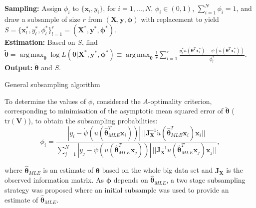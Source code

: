 \documentclass[a0paper,portrait]{baposter}
\DeclareMathOperator*{\argmaxA}{arg\,max}
\begin{document}
\begin{poster}
{    \begin{algorithm}[H]
    \SetAlgoLined
        \textbf{Sampling:} Assign $\phi_i$ to $\{\bm{x}_i,y_i\}$, for $i=1,...,N$, $\phi_i \in (0,1)$, $\sum_{i=1}^{N} \phi_i=1$, and draw a subsample of size $r$ from $(\bm{X},\bm{y},\bm{\phi})$ with replacement to yield $S = \{\bm{x}_l^*,y_l^*,\phi_l^*\}_{l=1}^r = (\bm{X}^*,\bm{y}^*,\bm{\phi}^*)$. \\
        \textbf{Estimation:} Based on $S$, find
        $\tilde{\bm{\theta}} = \argmaxA_{\bm{\theta}} \log{L(\bm{\theta}|\bm{X}^*,\bm{y}^*,\bm{\phi}^*)} \equiv \argmaxA_{\bm{\theta}} \frac{1}{r} \sum_{l=1}^{r} \frac{y^*_l u(\bm{\theta}^T\bm{x}^*_l) - \psi(u(\bm{\theta}^T\bm{x}^*_l))}{\phi^*_l}.$ \textbf{Output:} $\tilde{\bm{\theta}}$ and $S$.
    \caption{General subsampling algorithm \textcite{ai2021optimal}} \label{Algo:GenSam}
    \end{algorithm} 
To determine the values of $\phi$, %
\textcite{ai2021optimal} considered the $A$-optimality criterion, corresponding to minimisation of the asymptotic mean squared error of $\tilde{\bm{\theta}}$ ($\mbox{tr}(\bm{V})$), to obtain the subsampling probabilities:
        \begin{equation}\label{Eq:1}
            \phi_i = \frac{|y_i - \dot{\psi}(u(\hat{\bm{\theta}}^T_{MLE}\bm{x}_i))|\, ||\bm{J}^{-1}_{\bm{X}} \dot{u}(\hat{\bm{\theta}}^T_{MLE}\bm{x}_i)\bm{x}_i ||}{\sum_{j=1}^{N} |y_j - \dot{\psi}(u(\hat{\bm{\theta}}^T_{MLE}\bm{x}_j))|\, ||\bm{J}^{-1}_{\bm{X}} \dot{u}(\hat{\bm{\theta}}^T_{MLE}\bm{x}_j)\bm{x}_j ||},    
        \end{equation}
        
where $\hat{\bm{\theta}}_{MLE}$ is an estimate of $\bm{\theta}$ based on the whole big data set and $\bm{J_X}$ is the observed information matrix. 
As $\bm{\phi}$ depends on $\hat{\bm{\theta}}_{MLE}$, a two stage subsampling strategy was proposed where an initial subsample was used to provide an estimate of $\hat{\bm{\theta}}_{MLE}$. 
}


\end{poster}
\end{document}
